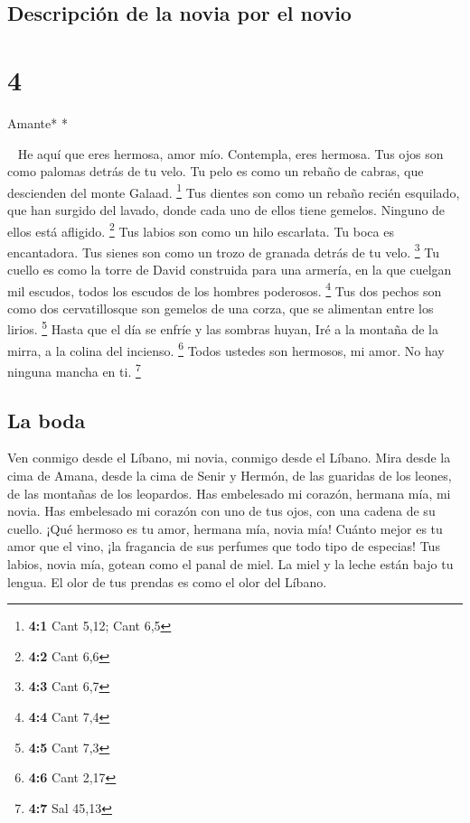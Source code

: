 \hypertarget{descripciuxf3n-de-la-novia-por-el-novio}{%
\subsection{Descripción de la novia por el
novio}\label{descripciuxf3n-de-la-novia-por-el-novio}}

\hypertarget{section-3}{%
\section{4}\label{section-3}}

\emph{\hfill\break
}Amante* *

~ He aquí que eres hermosa, amor mío. Contempla, eres
hermosa. Tus ojos son como palomas detrás de tu velo. Tu pelo es como un
rebaño de cabras, que descienden del monte Galaad. \footnote{\textbf{4:1}
  Cant 5,12; Cant 6,5}  Tus dientes son como un rebaño
recién esquilado, que han surgido del lavado, donde cada uno de ellos
tiene gemelos. Ninguno de ellos está afligido. \footnote{\textbf{4:2}
  Cant 6,6}  Tus labios son como un hilo escarlata. Tu
boca es encantadora. Tus sienes son como un trozo de granada detrás de
tu velo. \footnote{\textbf{4:3} Cant 6,7}  Tu cuello es
como la torre de David construida para una armería, en la que cuelgan
mil escudos, todos los escudos de los hombres poderosos. \footnote{\textbf{4:4}
  Cant 7,4}  Tus dos pechos son como dos cervatillosque
son gemelos de una corza, que se alimentan entre los lirios. \footnote{\textbf{4:5}
  Cant 7,3}  Hasta que el día se enfríe y las sombras
huyan, Iré a la montaña de la mirra, a la colina del incienso.
\footnote{\textbf{4:6} Cant 2,17}  Todos ustedes son
hermosos, mi amor. No hay ninguna mancha en ti. \footnote{\textbf{4:7}
  Sal 45,13}

\hypertarget{la-boda}{%
\subsection{La boda}\label{la-boda}}

 Ven conmigo desde el Líbano, mi novia, conmigo desde el
Líbano. Mira desde la cima de Amana, desde la cima de Senir y Hermón, de
las guaridas de los leones, de las montañas de los leopardos.
 Has embelesado mi corazón, hermana mía, mi novia. Has
embelesado mi corazón con uno de tus ojos, con una cadena de su cuello.
 ¡Qué hermoso es tu amor, hermana mía, novia mía! Cuánto
mejor es tu amor que el vino, ¡la fragancia de sus perfumes que todo
tipo de especias!  Tus labios, novia mía, gotean como el
panal de miel. La miel y la leche están bajo tu lengua. El olor de tus
prendas es como el olor del Líbano.

